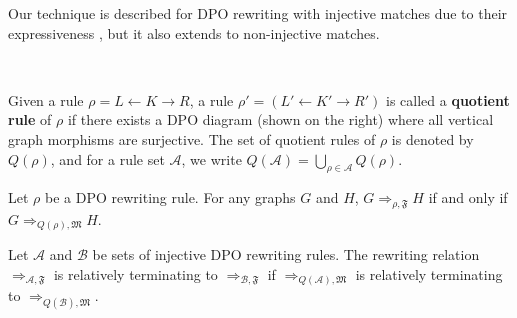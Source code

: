 \noindent Our technique is described for DPO rewriting with injective matches due to their expressiveness \cite{habel2001double}, but it also extends to non-injective matches.

\begin{definition} 
    \ \newline 
    \noindent
    \begin{minipage}{0.7\textwidth}
        Given a rule $\rho = L \leftarrow K \rightarrow R$, a rule $\rho' = (L' \leftarrow K' \rightarrow R')$ is called a \textbf{quotient rule} of $\rho$ if there exists a DPO diagram (shown on the right)
    where all vertical graph morphisms are surjective. The set of quotient rules of $\rho$ is denoted by $Q(\rho)$, and 
    for a rule set $\mathcal{A}$, we write $Q(\mathcal{A}) = \bigcup_{\rho\in\mathcal{A}} Q(\rho)$.
    \end{minipage}
    \hfill
    \begin{minipage}{0.29\textwidth}
        \hfill
    \end{minipage}
\end{definition}

\begin{lemma}
    Let $\rho$ be a DPO rewriting rule. For any graphs $G$ and $H$,
    $G \Rightarrow_{\rho,\mathfrak{F}} H$ if and only if $G \Rightarrow_{Q(\rho),\mathfrak{M}} H$.
\end{lemma}
\begin{corollary}
    \label{cor:termination}
    Let \(\mathcal{A}\) and \(\mathcal{B}\) be sets of injective DPO rewriting rules. 
    The rewriting relation $\Rightarrow_{\mathcal{A},\mathfrak{F}}$ is relatively terminating to $\Rightarrow_{\mathcal{B},\mathfrak{F}}$ 
    if 
    $\Rightarrow_{Q(\mathcal{A}),\mathfrak{M}}$ is relatively terminating to $\Rightarrow_{Q(\mathcal{B}),\mathfrak{M}}$.
\end{corollary}